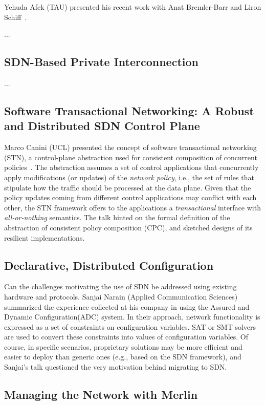 \documentclass[11pt,pdftex,letter]{article}
\begin{document}
Yehuda Afek (TAU) presented his recent work with Anat Bremler-Barr and
Liron Schiff~\cite{AfekBS14}.   

...

\subsection{SDN-Based Private Interconnection}

...

\subsection{Software Transactional Networking: A Robust and
  Distributed SDN Control Plane}

Marco Canini (UCL) presented the concept of software transactional
networking (STN), a control-plane abstraction used for consistent
composition of concurrent policies~\cite{stn,tr-stn}. The abstraction assumes a set of
control applications that concurrently apply modifications (or
updates) of the
\emph{network policy}, i.e., the set of rules that stipulate how the
traffic should be processed at the data plane.     
Given that the policy updates coming from different control applications may
conflict with each other, the STN framework offers to the applications
a \emph{transactional} interface with \emph{all-or-nothing} semantics.   
The talk hinted on the formal definition of the abstraction of consistent policy
composition (CPC), and sketched designs of its resilient implementations.  
 
\subsection{Declarative, Distributed Configuration}

Can the challenges motivating the use of SDN be addressed using
existing hardware and protocols. Sanjai Narain (Applied Communication Sciences) summarized the
experience collected at his company in using the Assured and Dynamic
Configuration(ADC) system. In their approach, network functionality is
expressed as a set of constraints on configuration variables. SAT or
SMT solvers are used to convert these constraints into values of configuration variables.
Of course, in specific scenarios, proprietary solutions may be more
efficient and  easier to deploy than generic ones (e.g., based on the
SDN framework), and Sanjai's talk questioned the very
motivation behind migrating to SDN. 

\subsection{Managing the Network with Merlin}
\end{document}
